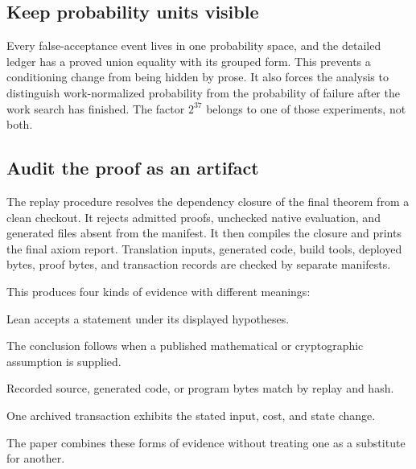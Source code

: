 \subsection{Keep probability units visible}

Every false-acceptance event lives in one probability space, and the detailed
ledger has a proved union equality with its grouped form.  This prevents a
conditioning change from being hidden by prose.  It also forces the analysis
to distinguish work-normalized probability from the probability of failure
after the work search has finished.  The factor \(2^{37}\) belongs to one of
those experiments, not both.

\subsection{Audit the proof as an artifact}

The replay procedure resolves the dependency closure of the final theorem
from a clean checkout.  It rejects admitted proofs, unchecked native
evaluation, and generated files absent from the manifest.  It then compiles
the closure and prints the final axiom report.  Translation inputs, generated
code, build tools, deployed bytes, proof bytes, and transaction records are
checked by separate manifests.

This produces four kinds of evidence with different meanings:

\begin{description}[leftmargin=0.23\textwidth,style=nextline]
  \item[Machine-checked theorem] Lean accepts a statement under its displayed
        hypotheses.
  \item[Conditional reduction] The conclusion follows when a published
        mathematical or cryptographic assumption is supplied.
  \item[Deterministic identity] Recorded source, generated code, or program
        bytes match by replay and hash.
  \item[Execution record] One archived transaction exhibits the stated input,
        cost, and state change.
\end{description}

The paper combines these forms of evidence without treating one as a
substitute for another.
